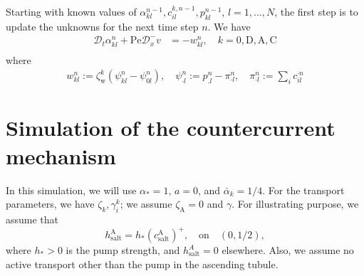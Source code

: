 \documentclass{article}
\begin{document}
Starting with known values of $\alpha^{n-1}_{kl},c_{il}^{k,n-1}, p_{kl}^{n-1}$, $l = 1,\dots,N$, the first step is to update the unknowns for the next time step $n$.
We have
\begin{align}
    \mathcal{D}_t \alpha_{kl}^n +\mathrm{Pe}\mathcal{D}_x^-v &= -w_{kl}^{n},\quad k=0,\mathrm{D},\mathrm{A},\mathrm{C}\\
\end{align}
where
\begin{align}
    w_{kl}^n:=\zeta_\mathrm{w}^k\left( \psi_{kl}^n-\psi_{0l}^n \right),\quad
    \psi_{\cdot l}^n:= p_{.l}^n - \pi_{\cdot l}^n,\quad \pi_{\cdot l}^n:= \sum_i c_{il}^{\cdot n}
\end{align}

\section{Simulation of the countercurrent mechanism}

In this simulation, we will use $\alpha_* = 1$, $a=0$, and $\bar{\alpha}_k = 1/4$.
For the transport parameters, we have $\zeta_k,\gamma_i^k$; we assume $\zeta_\mathrm{A} = 0$ and $\gamma$.
    For illustrating purpose, we assume that
    \begin{equation}
        h_\mathrm{salt}^\mathrm{A} = h_*(c_\mathrm{salt}^\mathrm{A})^+,\quad \text{on}\quad (0,1/2),
    \end{equation}
        where $h_*>0$ is the pump strength, and $h^A_\mathrm{salt} = 0$ elsewhere.
    Also, we assume no active transport other than the pump in the ascending tubule.
\end{document}
